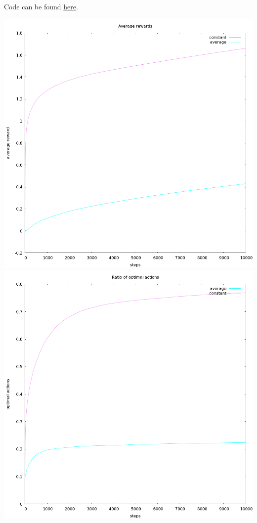 \documentclass[12pt,a4paper]{article}
\begin{document}
\begin{enumerate}
  Code can be found \href{https://github.com/hannagabor/SBRL/blob/master/2.5/src/main.rs}{here}.
  \begin{center}
  \includegraphics[scale=0.3]{average}
  \\
  \includegraphics[scale=0.3]{optimal}
  \end{center}



\end{enumerate}
\end{document}
